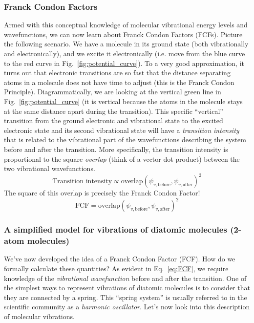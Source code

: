 \documentclass[12pt]{article}
\begin{document}
\subsubsection{Franck Condon Factors}

Armed with this conceptual knowledge of molecular vibrational energy levels and wavefunctions, we can now learn about Franck Condon Factors (FCFs). Picture the following scenario. We have a molecule in its ground state (both vibrationally and electronically), and we excite it electronically (i.e. move from the blue curve to the red curve in Fig.~\ref{fig:potential_curve}). To a very good approximation, it turns out that electronic transitions are so fast that the distance separating atoms in a molecule does not have time to adjust (this is the Franck Condon Principle). Diagrammatically, we are looking at the vertical green line in Fig.~\ref{fig:potential_curve} (it is vertical because the atoms in the molecule stays at the same distance apart during the transition). This specific ``vertical'' transition from the ground electronic and vibrational state to the excited electronic state and its second vibrational state will have a \textit{transition intensity} that is related to the vibrational part of the wavefunctions describing the system before and after the transition. More specifically, the transition intensity is proportional to the square \textit{overlap} (think of a vector dot product) between the two vibrational wavefunctions.
\begin{equation}
    \text{Transition}\text{ intensity} \propto \text{overlap}(\psi_{v,\text{before}},\psi_{v,\text{after}})^2
\end{equation}
The square of this overlap is precisely the Franck Condon Factor!
\begin{equation} \label{eq:FCF}
    \text{FCF} = \text{overlap}(\psi_{v,\text{before}},\psi_{v,\text{after}})^2
\end{equation}

\subsubsection{A simplified model for vibrations of diatomic molecules (2-atom molecules)}

We've now developed the idea of a Franck Condon Factor (FCF). How do we formally calculate these quantities?
As evident in Eq.~\eqref{eq:FCF}, we require knowledge of the {\it vibrational wavefunction} before and after the transition.
One of the simplest ways to represent vibrations of diatomic molecules is to consider that they are connected by a spring.
This ``spring system'' is usually referred to in the scientific community as a {\it harmonic oscillator}. Let's now look into this description of molecular vibrations.
\end{document}
